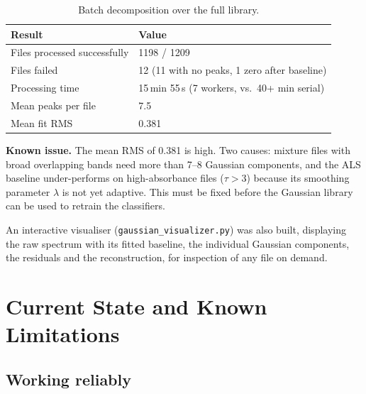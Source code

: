 \documentclass[11pt,a4paper]{article}
\newcommand{\code}[1]{\texttt{\small #1}}
\begin{document}
\begin{table}[H]
\centering
\small
\begin{tabular}{@{}ll@{}}
\toprule
\textbf{Result} & \textbf{Value} \\
\midrule
Files processed successfully & 1198 / 1209 \\
Files failed                 & 12 (11 with no peaks, 1 zero after baseline) \\
Processing time              & 15\,min 55\,s (7 workers, vs.\ 40+ min serial) \\
Mean peaks per file          & 7.5 \\
Mean fit RMS                 & 0.381 \\
\bottomrule
\end{tabular}
\caption{Batch decomposition over the full library.}
\end{table}

\begin{goldbox}
\textbf{Known issue.} The mean RMS of 0.381 is high. Two causes: mixture
files with broad overlapping bands need more than 7--8 Gaussian components,
and the ALS baseline under-performs on high-absorbance files ($\tau > 3$)
because its smoothing parameter $\lambda$ is not yet adaptive. This must be
fixed before the Gaussian library can be used to retrain the classifiers.
\end{goldbox}

An interactive visualiser (\code{gaussian\_visualizer.py}) was also built,
displaying the raw spectrum with its fitted baseline, the individual
Gaussian components, the residuals and the reconstruction, for inspection
of any file on demand.

\section{Current State and Known Limitations}
\label{sec:known-problems}

\subsection{Working reliably}
\end{document}
